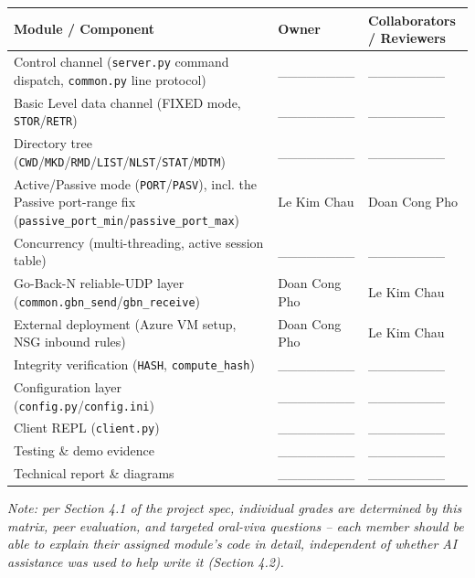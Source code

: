\documentclass[11pt]{article}
\begin{document}
\begin{longtable}{@{}p{5cm}p{4cm}p{4.5cm}@{}}
\toprule
\textbf{Module / Component} & \textbf{Owner} & \textbf{Collaborators / Reviewers} \\
\midrule
\endhead %

Control channel (\texttt{server.py} command dispatch, \texttt{common.py} line protocol) & \_\_\_\_\_\_\_\_ & \_\_\_\_\_\_\_\_ \\
Basic Level data channel (FIXED mode, \texttt{STOR}/\allowbreak\texttt{RETR}) & \_\_\_\_\_\_\_\_ & \_\_\_\_\_\_\_\_ \\
Directory tree (\texttt{CWD}/\allowbreak\texttt{MKD}/\allowbreak\texttt{RMD}/\allowbreak\texttt{LIST}/\allowbreak\texttt{NLST}/\allowbreak\texttt{STAT}/\allowbreak\texttt{MDTM}) & \_\_\_\_\_\_\_\_ & \_\_\_\_\_\_\_\_ \\
Active/Passive mode (\texttt{PORT}/\allowbreak\texttt{PASV}), incl. the Passive port-range fix (\texttt{passive\_port\_min}/\allowbreak\texttt{passive\_port\_max}) & Le Kim Chau & Doan Cong Pho \\
Concurrency (multi-threading, active session table) & \_\_\_\_\_\_\_\_ & \_\_\_\_\_\_\_\_ \\
Go-Back-N reliable-UDP layer (\texttt{common.gbn\_send}/\allowbreak\texttt{gbn\_receive}) & Doan Cong Pho & Le Kim Chau \\
External deployment (Azure VM setup, NSG inbound rules) & Doan Cong Pho & Le Kim Chau \\
Integrity verification (\texttt{HASH}, \texttt{compute\_hash}) & \_\_\_\_\_\_\_\_ & \_\_\_\_\_\_\_\_ \\
Configuration layer (\texttt{config.py}/\allowbreak\texttt{config.ini}) & \_\_\_\_\_\_\_\_ & \_\_\_\_\_\_\_\_ \\
Client REPL (\texttt{client.py}) & \_\_\_\_\_\_\_\_ & \_\_\_\_\_\_\_\_ \\
Testing \& demo evidence & \_\_\_\_\_\_\_\_ & \_\_\_\_\_\_\_\_ \\
Technical report \& diagrams & \_\_\_\_\_\_\_\_ & \_\_\_\_\_\_\_\_ \\
\bottomrule
\end{longtable}
\textit{Note: per Section 4.1 of the project spec, individual grades are
determined by this matrix, peer evaluation, and targeted oral-viva questions --
each member should be able to explain their assigned module's code in detail,
independent of whether AI assistance was used to help write it (Section 4.2).}
\end{document}
